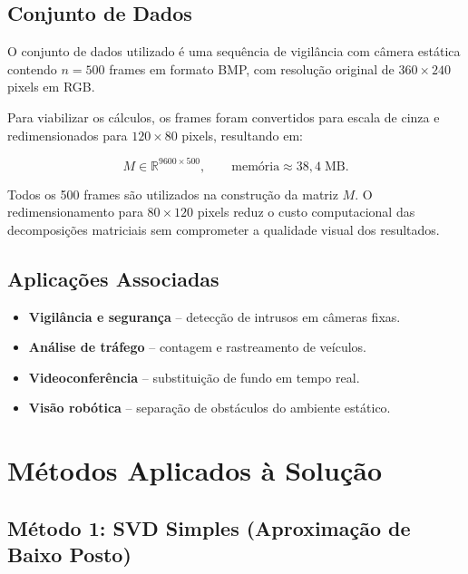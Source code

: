 \documentclass[12pt, a4paper]{article}
\begin{document}
\subsection{Conjunto de Dados}

O conjunto de dados utilizado é uma sequência de vigilância com câmera estática
contendo $n = 500$ frames em formato BMP, com resolução original de
$360 \times 240$ pixels em RGB.

Para viabilizar os cálculos, os frames foram convertidos para escala de cinza e
redimensionados para $120 \times 80$ pixels, resultando em:

\begin{equation*}
  M \in \mathbb{R}^{9600 \times 500}, \qquad
  \text{memória} \approx 38{,}4\;\text{MB}.
\end{equation*}

\begin{destaque}
  Todos os 500 frames são utilizados na construção da matriz $M$. O
  redimensionamento para $80 \times 120$ pixels reduz o custo computacional das
  decomposições matriciais sem comprometer a qualidade visual dos resultados.
\end{destaque}

\subsection{Aplicações Associadas}

\begin{itemize}
  \item \textbf{Vigilância e segurança} – detecção de intrusos em câmeras fixas.
  \item \textbf{Análise de tráfego} – contagem e rastreamento de veículos.
  \item \textbf{Videoconferência} – substituição de fundo em tempo real.
  \item \textbf{Visão robótica} – separação de obstáculos do ambiente estático.
\end{itemize}

\newpage

\section{Métodos Aplicados à Solução}
\label{sec:metodos}

\subsection{Método 1: SVD Simples (Aproximação de Baixo Posto)}
\end{document}
